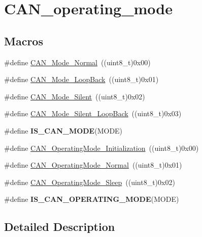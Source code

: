 \hypertarget{group___c_a_n__operating__mode}{}\section{C\+A\+N\+\_\+operating\+\_\+mode}
\label{group___c_a_n__operating__mode}
\subsection*{Macros}
\begin{DoxyCompactItemize}
\item 
\#define \hyperlink{group___c_a_n__operating__mode_gaaf1f48ab4917ccfd5fd31dd781d59e29}{C\+A\+N\+\_\+\+Mode\+\_\+\+Normal}~((uint8\+\_\+t)0x00)
\item 
\#define \hyperlink{group___c_a_n__operating__mode_gaad036c944403186eb3496ff65020c0ee}{C\+A\+N\+\_\+\+Mode\+\_\+\+Loop\+Back}~((uint8\+\_\+t)0x01)
\item 
\#define \hyperlink{group___c_a_n__operating__mode_gac05e5d666f18eb35e8da70e6e17e8fb8}{C\+A\+N\+\_\+\+Mode\+\_\+\+Silent}~((uint8\+\_\+t)0x02)
\item 
\#define \hyperlink{group___c_a_n__operating__mode_ga087afa0d24d2cf399225993573c984eb}{C\+A\+N\+\_\+\+Mode\+\_\+\+Silent\+\_\+\+Loop\+Back}~((uint8\+\_\+t)0x03)
\item 
\#define {\bfseries I\+S\+\_\+\+C\+A\+N\+\_\+\+M\+O\+D\+E}(M\+O\+D\+E)
\item 
\#define \hyperlink{group___c_a_n__operating__mode_gace8a4b5c164aba6f473d6254ad1e8a36}{C\+A\+N\+\_\+\+Operating\+Mode\+\_\+\+Initialization}~((uint8\+\_\+t)0x00)
\item 
\#define \hyperlink{group___c_a_n__operating__mode_ga663ecffaa60d1a201a035dfa45325848}{C\+A\+N\+\_\+\+Operating\+Mode\+\_\+\+Normal}~((uint8\+\_\+t)0x01)
\item 
\#define \hyperlink{group___c_a_n__operating__mode_ga173b85d2baaa6249d966b8073e3ad8ca}{C\+A\+N\+\_\+\+Operating\+Mode\+\_\+\+Sleep}~((uint8\+\_\+t)0x02)
\item 
\#define {\bfseries I\+S\+\_\+\+C\+A\+N\+\_\+\+O\+P\+E\+R\+A\+T\+I\+N\+G\+\_\+\+M\+O\+D\+E}(M\+O\+D\+E)
\end{DoxyCompactItemize}


\subsection{Detailed Description}


